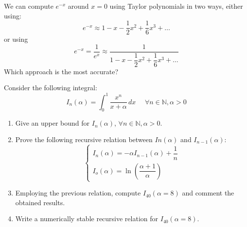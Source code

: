 \documentclass[12pt, a4paper]{report}
\newtheorem[style=M,bodystyle=\normalfont]{theorem}{Theorem}
\newtheorem[style=M,bodystyle=\normalfont]{corollary}{Corollary}
\newtheorem[style=M,bodystyle=\normalfont]{lemma}{Lemma}
\newtheorem[style=M,bodystyle=\normalfont]{definition}{Definition}
\begin{document}
    \newpage

    \begin{Exercise}[label=11]
        We can compute $e^{-x}$ around $x=0$ using Taylor polynomials in two ways, either using:
        \[e^{-x} \approx 1-x-\dfrac{1}{2}x^2+\dfrac{1}{6}x^3+\dots\]
        or using 
        \[e^{-x}=\dfrac{1}{e^x} \approx \dfrac{1}{1-x-\dfrac{1}{2}x^2+\dfrac{1}{6}x^3+\dots}\]
        Which approach is the most accurate?
    \end{Exercise}
    \begin{Answer}[ref=11]
        
    \end{Answer}

    \newpage

    \begin{Exercise}[label=12]
        Consider the following integral: 
        \[I_n(\alpha)=\int_{0}^{1} \dfrac{x^n}{x+\alpha} \,dx \:\:\:\:\:\: \forall n \in \mathbb{N},\alpha>0\]
        \begin{enumerate}
            \item Give an upper bound for $I_n(\alpha)$, $\forall n \in \mathbb{N}, \alpha > 0$.
            \item Prove the following recursive relation between $In(\alpha)$ and $I_{n-1}(\alpha)$:
            \[
                \begin{cases}
                    I_n(\alpha)=-\alpha I_{n-1}(\alpha)+\dfrac{1}{n} \\
                    I_o(\alpha)=\ln{\left( \dfrac{\alpha + 1}{\alpha} \right)}
                \end{cases}
            \]
            \item Employing the previous relation, compute $I_40(\alpha = 8)$ and comment the obtained results. 
            \item Write a numerically stable recursive relation for $I_40(\alpha = 8)$.
        \end{enumerate}
    \end{Exercise}
    \begin{Answer}[ref=12]
        
    \end{Answer}

    \newpage
\end{document}
